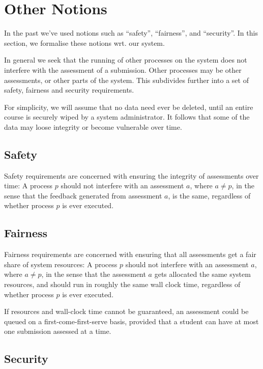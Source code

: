 
\section{Other Notions}

\label{section:analysis:other-notions}

In the past we've used notions such as ``safety'', ``fairness'', and
``security''.  In this section, we formalise these notions wrt. our system.

In general we seek that the running of other processes on the system does not
interfere with the assessment of a submission. Other processes may be other
assessments, or other parts of the system. This subdivides further into a set
of safety, fairness and security requirements.

For simplicity, we will assume that no data need ever be deleted, until an
entire course is securely wiped by a system administrator. It follows that some
of the data may loose integrity or become vulnerable over time.

\subsection{Safety}

Safety requirements are concerned with ensuring the integrity of assessments
over time: A process $p$ should not interfere with an assessment $a$, where
$a\neq p$, in the sense that the feedback generated from assessment $a$, is the
same, regardless of whether process $p$ is ever executed.

\subsection{Fairness}

Fairness requirements are concerned with ensuring that all assessments get a
fair share of system resources: A process $p$ should not interfere with an
assessment $a$, where $a\neq p$, in the sense that the assessment $a$ gets
allocated the same system resources, and should run in roughly the same wall
clock time, regardless of whether process $p$ is ever executed.

If resources and wall-clock time cannot be guaranteed, an assessment could be
queued on a first-come-first-serve basis, provided that a student can have at
most one submission assessed at a time.

\subsection{Security}

